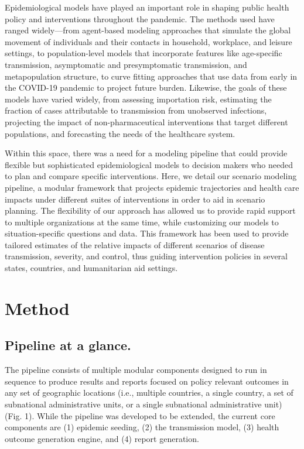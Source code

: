 Epidemiological models have played an important role in shaping public health policy and interventions throughout the pandemic. The methods used have ranged widely—from agent-based modeling approaches that simulate the global movement of individuals and their contacts in household, workplace, and leisure settings\cite{Ferguson:ReportImpactNonpharmaceutical:2020}, to population-level models that incorporate features like age-specific transmission, asymptomatic and presymptomatic transmission, and metapopulation structure\cite{Branas:FlatteningCurveIt:2020,Moghadas:ProjectingHospitalUtilization:2020,Davies:AgedependentEffectsTransmission:2020}, to curve fitting approaches that use data from early in the COVID-19 pandemic to project future burden\cite{IHMECOVID-19healthserviceutilizationforecastingteam:ForecastingImpactFirst:2020}. Likewise, the goals of these models have varied widely, from assessing importation risk, estimating the fraction of cases attributable to transmission from unobserved infections, projecting the impact of non-pharmaceutical interventions that target different populations, and forecasting the needs of the healthcare system. 

Within this space, there was a need for a modeling pipeline that could provide flexible but sophisticated epidemiological models to decision makers who needed to plan and compare specific interventions. Here, we detail our scenario modeling pipeline, a modular framework that projects epidemic trajectories and health care impacts under different suites of interventions in order to aid in scenario planning. The flexibility of our approach has allowed us to provide rapid support to multiple organizations at the same time, while customizing our models to situation-specific questions and data. This framework has been used to provide tailored estimates of the relative impacts of different scenarios of disease transmission, severity, and control, thus guiding intervention policies in several states, countries, and humanitarian aid settings.

\section{Method}
\subsection{Pipeline at a glance.}
The pipeline consists of multiple modular components designed to run in sequence to produce results and reports focused on policy relevant outcomes in any set of geographic locations (i.e., multiple countries, a single country, a set of subnational administrative units, or a single subnational administrative unit) (Fig. 1). While the pipeline was developed to be extended, the current core components are (1) epidemic seeding, (2) the transmission model, (3) health outcome generation engine, and (4) report generation. 


